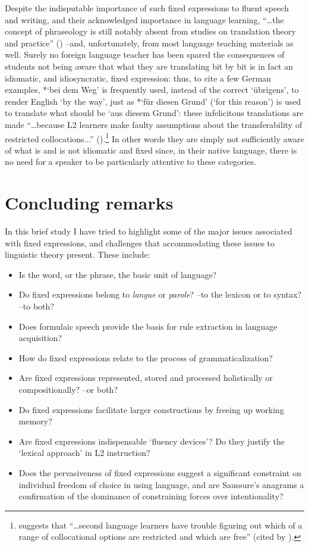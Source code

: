 \documentclass[output=paper]{langsci/langscibook}
\begin{document}
Despite the indisputable importance of such fixed expressions to fluent speech and writing, and their acknowledged importance in language learning, “…the concept of phraseology is still notably absent from studies on translation theory and practice” (\citealt[xxiv]{granger_phraseology:_2008}) –and, unfortunately, from most language teaching materials as well. Surely no foreign language teacher has been spared the consequences of students not being aware that what they are translating bit by bit is in fact an idiomatic, and idiosyncratic, fixed expression: thus, to cite a few German examples, *‘bei dem  Weg’ is frequently used, instead of the correct ‘übrigens’, to render English ‘by the way’, just as *‘für diesen Grund’ (‘for this reason’) is used to translate what should be ‘aus diesem Grund’: these infelicitous translations are made “…because L2 learners make faulty assumptions about the transferability of restricted collocations...” (\citealt[833]{kim_frequency_2012}).\footnote{ \textrm{\citet[34]{howarth_phraseology_1998} suggests that “…second language learners have trouble figuring out which of a range of collocational options are restricted and which are free” (cited by \citealt[833]{kim_frequency_2012}).}} In other words they are simply not sufficiently aware of what is and is not idiomatic and fixed since, in their native language, there is no need for a speaker to be particularly attentive to these categories.

\section{Concluding remarks}
In this brief study I have tried to highlight some of the major issues associated with fixed expressions, and challenges that accommodating these issues to linguistic theory present. These include:

\begin{itemize}
\item Is the word, or the phrase, the basic unit of language?
\item Do fixed expressions belong to \textit{langue} or \textit{parole}? –to the lexicon or to syntax? –to both? 
\item Does formulaic speech provide the basis for rule extraction in language acquisition?
\item How do fixed expressions relate to the process of grammaticalization?
\item Are fixed expressions represented, stored and processed holistically or compositionally? –or both?
\item Do fixed expressions facilitate larger constructions by freeing up working memory?
\item Are fixed expressions indispensable ‘fluency devices’? Do they justify the ‘lexical approach’ in L2 instruction?
\item Does the pervasiveness of fixed expressions suggest a significant constraint on individual freedom of choice in using language, and are Saussure’s anagrams a confirmation of the dominance of constraining forces over intentionality?
\end{itemize}
\end{document}
